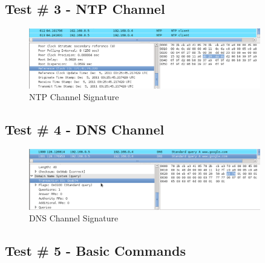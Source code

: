 \documentclass[titlepage]{article}
\begin{document}
\clearpage

\subsection{Test \# 3 - NTP Channel}

\begin{figure}[htb]                                                                       
  \begin{center}
    \includegraphics[width=0.9\textwidth]{Pictures/NTP_SIG.png}
  \end{center}
  \caption{NTP Channel Signature}
  \label{fig:ntp_sig}
\end{figure}

\clearpage

\subsection{Test \# 4 - DNS Channel}

\begin{figure}[htb]                                                                       
  \begin{center}
    \includegraphics[width=0.9\textwidth]{Pictures/DNS_SIG.png}
  \end{center}
  \caption{DNS Channel Signature}
  \label{fig:dns_sig}
\end{figure}

\clearpage

\subsection{Test \# 5 - Basic Commands}
\end{document}
